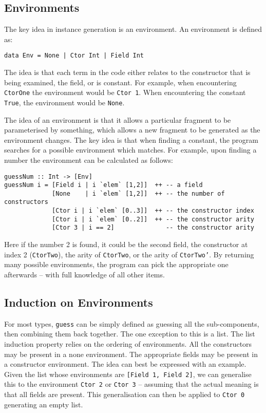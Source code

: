 \documentclass{llncs}
\newcommand{\T}[1]{\texttt{#1}}
\begin{document}
\subsection{Environments}

The key idea in instance generation is an environment. An environment is defined as:

\begin{verbatim}
data Env = None | Ctor Int | Field Int
\end{verbatim}

The idea is that each term in the code either relates to the constructor that is being examined, the field, or is constant. For example, when encountering \T{CtorOne} the environment would be \T{Ctor 1}. When encountering the constant \T{True}, the environment would be \T{None}.

The idea of an environment is that it allows a particular fragment to be parameterised by something, which allows a new fragment to be generated as the environment changes. The key idea is that when finding a constant, the program searches for a possible environment which matches. For example, upon finding a number the environment can be calculated as follows:

\begin{verbatim}
guessNum :: Int -> [Env]
guessNum i = [Field i | i `elem` [1,2]]  ++ -- a field
             [None    | i `elem` [1,2]]  ++ -- the number of constructors
             [Ctor i | i `elem` [0..3]]  ++ -- the constructor index
             [Ctor i | i `elem` [0..2]]  ++ -- the constructor arity
             [Ctor 3 | i == 2]              -- the constructor arity
\end{verbatim}

Here if the number 2 is found, it could be the second field, the constructor at index 2 (\T{CtorTwo}), the arity of \T{CtorTwo}, or the arity of \T{CtorTwo'}. By returning many possible environments, the program can pick the appropriate one afterwards -- with full knowledge of all other items.

\subsection{Induction on Environments}

For most types, \T{guess} can be simply defined as guessing all the sub-components, then combining them back together. The one exception to this is a list. The list induction property relies on the ordering of environments. All the constructors may be present in a none environment. The appropriate fields may be present in a constructor environment. The idea can best be expressed with an example. Given the list whose environments are \T{[Field 1, Field 2]}, we can generalise this to the environment \T{Ctor 2} or \T{Ctor 3} -- assuming that the actual meaning is that all fields are present. This generalisation can then be applied to \T{Ctor 0} generating an empty list.
\end{document}

